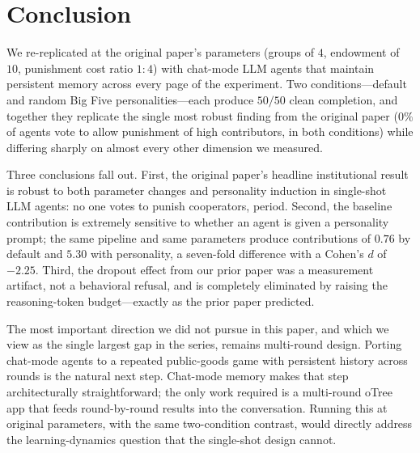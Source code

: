 \documentclass[12pt, a4paper]{article}
\begin{document}
\section{Conclusion}

We re-replicated \citet{ertan2009who} at the original paper's parameters (groups of $4$, endowment of $10$, punishment cost ratio $1{:}4$) with chat-mode LLM agents that maintain persistent memory across every page of the experiment. Two conditions---default and random Big Five personalities---each produce $50/50$ clean completion, and together they replicate the single most robust finding from the original paper ($0\%$ of agents vote to allow punishment of high contributors, in both conditions) while differing sharply on almost every other dimension we measured.

Three conclusions fall out. First, the original paper's headline institutional result is robust to both parameter changes and personality induction in single-shot LLM agents: no one votes to punish cooperators, period. Second, the baseline contribution is extremely sensitive to whether an agent is given a personality prompt; the same pipeline and same parameters produce contributions of $0.76$ by default and $5.30$ with personality, a seven-fold difference with a Cohen's $d$ of $-2.25$. Third, the dropout effect from our prior paper was a measurement artifact, not a behavioral refusal, and is completely eliminated by raising the reasoning-token budget---exactly as the prior paper predicted.

The most important direction we did not pursue in this paper, and which we view as the single largest gap in the series, remains multi-round design. Porting chat-mode agents to a repeated public-goods game with persistent history across rounds is the natural next step. Chat-mode memory makes that step architecturally straightforward; the only work required is a multi-round oTree app that feeds round-by-round results into the conversation. Running this at original parameters, with the same two-condition contrast, would directly address the learning-dynamics question that the single-shot design cannot.



\end{document}
